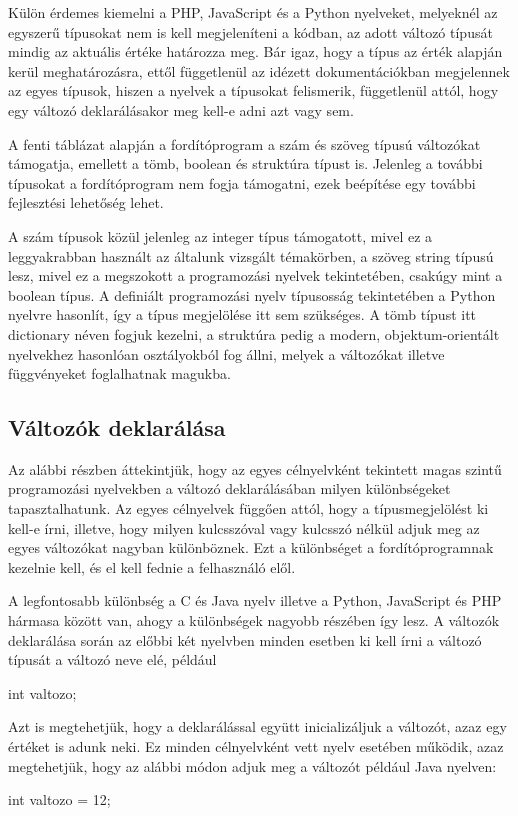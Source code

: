 Külön érdemes kiemelni a PHP, JavaScript és a Python nyelveket, melyeknél az egyszerű típusokat nem is kell megjeleníteni a kódban, az adott változó típusát mindig az aktuális értéke határozza meg. Bár igaz, hogy a típus az érték alapján kerül meghatározásra, ettől függetlenül az idézett dokumentációkban megjelennek az egyes típusok, hiszen a nyelvek a típusokat felismerik, függetlenül attól, hogy egy változó deklarálásakor meg kell-e adni azt vagy sem.

A fenti táblázat alapján a fordítóprogram a szám és szöveg típusú változókat támogatja, emellett a tömb, boolean és struktúra típust is. Jelenleg a további típusokat a fordítóprogram nem fogja támogatni, ezek beépítése egy további fejlesztési lehetőség lehet.

A szám típusok közül jelenleg az integer típus támogatott, mivel ez a leggyakrabban használt az általunk vizsgált témakörben, a szöveg string típusú lesz, mivel ez a megszokott a programozási nyelvek tekintetében, csakúgy mint a boolean típus. A definiált programozási nyelv típusosság tekintetében a Python nyelvre hasonlít, így a típus megjelölése itt sem szükséges.
A tömb típust itt dictionary néven fogjuk kezelni, a struktúra pedig a modern, objektum-orientált nyelvekhez hasonlóan osztályokból fog állni, melyek a változókat illetve függvényeket foglalhatnak magukba.

\subsection{Változók deklarálása}

Az alábbi részben áttekintjük, hogy az egyes célnyelvként tekintett magas szintű programozási nyelvekben a változó deklarálásában milyen különbségeket tapasztalhatunk. Az egyes célnyelvek függően attól, hogy a típusmegjelölést ki kell-e írni, illetve, hogy milyen kulcsszóval vagy kulcsszó nélkül adjuk meg az egyes változókat nagyban különböznek. Ezt a különbséget a fordítóprogramnak kezelnie kell, és el kell fednie a felhasználó elől.

A legfontosabb különbség a C és Java nyelv illetve a Python, JavaScript és PHP hármasa között van, ahogy a különbségek nagyobb részében így lesz. A változók deklarálása során az előbbi két nyelvben minden esetben ki kell írni a változó típusát a változó neve elé, például
\begin{cpp}
	int valtozo;
\end{cpp}

Azt is megtehetjük, hogy a deklarálással együtt inicializáljuk a változót, azaz egy értéket is adunk neki. Ez minden célnyelvként vett nyelv esetében működik, azaz megtehetjük, hogy az alábbi módon adjuk meg a változót például Java nyelven:
\begin{cpp}
	int valtozo = 12;
\end{cpp}

